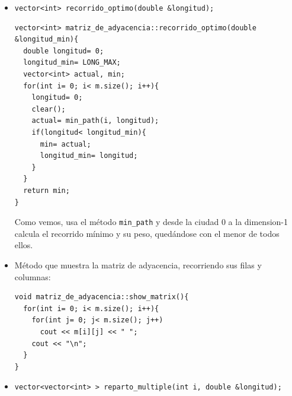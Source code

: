 \documentclass[12pt]{article}
\begin{document}
\begin{itemize}[wide, nosep, labelindent = 0pt, topsep = 1ex]
\item \verb|vector<int> recorrido_optimo(double &longitud);|
\begin{lstlisting}
vector<int> matriz_de_adyacencia::recorrido_optimo(double &longitud_min){
  double longitud= 0;
  longitud_min= LONG_MAX;
  vector<int> actual, min;
  for(int i= 0; i< m.size(); i++){
    longitud= 0;
    clear();
    actual= min_path(i, longitud);
    if(longitud< longitud_min){
      min= actual;
      longitud_min= longitud;
    }
  }
  return min;
}
\end{lstlisting}
Como vemos, usa el método \verb|min_path| y desde la ciudad 0 a la dimension-1 calcula el recorrido mínimo y su peso, quedándose con el menor de todos ellos.
 
\item Método que muestra la matriz de adyacencia, recorriendo sus filas y columnas: 
\begin{lstlisting}
void matriz_de_adyacencia::show_matrix(){
  for(int i= 0; i< m.size(); i++){
    for(int j= 0; j< m.size(); j++)
      cout << m[i][j] << " ";
    cout << "\n";
  }
}
\end{lstlisting}
\item \verb|vector<vector<int> > reparto_multiple(int i, double &longitud);|
\end{itemize}
\end{document}
